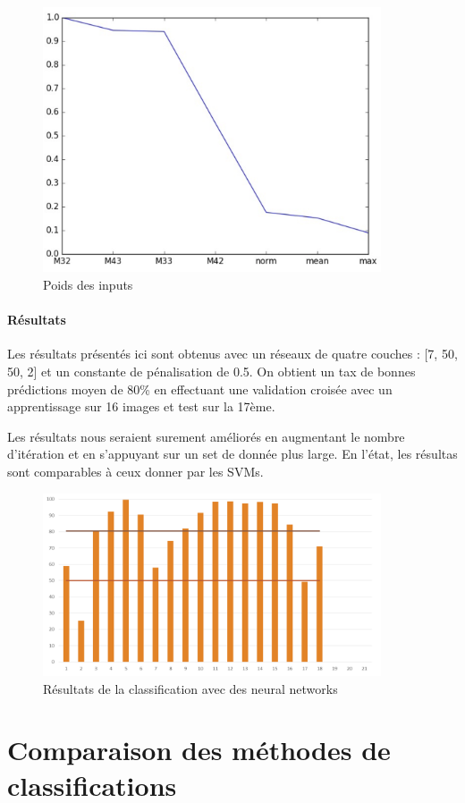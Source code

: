 \documentclass[a4paper,10pt]{report}
\begin{document}
\begin{figure}[htbp]
  \caption{Poids des inputs}
  \centering
  \includegraphics[width=10cm]{input_weight_nn.png}
\end{figure}

\paragraph{Résultats}
Les résultats présentés ici sont obtenus avec un réseaux de quatre couches : [7, 50, 50, 2] et un constante de pénalisation de 0.5.
On obtient un tax de bonnes prédictions moyen de 80\% en effectuant une validation croisée avec un apprentissage sur 16 images et test sur la 17ème. 

Les résultats nous seraient surement améliorés en augmentant le nombre d'itération et en s'appuyant sur un set de donnée plus large. En l'état, les résultas sont comparables à ceux donner par les SVMs.
\begin{figure}[htbp]
  \caption{Résultats de la classification avec des neural networks}
  \centering
  \includegraphics[width=10cm]{nn_results.png}
\end{figure}

\section{Comparaison des méthodes de classifications}
\end{document}

